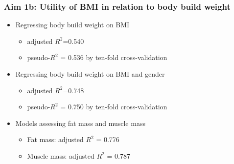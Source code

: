 \documentclass{beamer}
\begin{document}
\begin{frame}
\frametitle{Aim 1b: Utility of BMI in relation to body build weight}

\begin{itemize}
	\item Regressing body build weight on BMI
		\begin{itemize}
			\item adjusted $R^2$=0.540
			\item pseudo-$R^2$ = 0.536 by ten-fold cross-validation
 	
		\end{itemize}
	\item Regressing body build weight on BMI and gender
		\begin{itemize}
			\item adjusted $R^2$=0.748
			\item pseudo-$R^2$ = 0.750 by ten-fold cross-validation
 	
		\end{itemize}
	\item Models assessing fat mass and muscle mass
		\begin{itemize}
			\item Fat mass: adjusted $R^2$ = 0.776
			\item Muscle mass: adjusted $R^2$ = 0.787
 	
		\end{itemize}
\end{itemize}

\end{frame}
\end{document}
